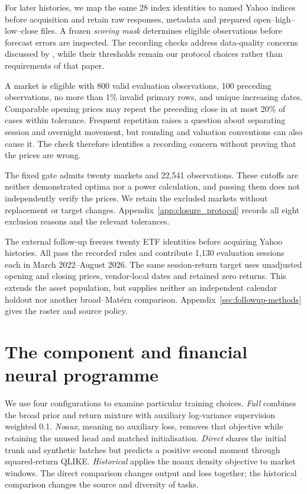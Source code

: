 For later histories, we map the same 28 index identities to named Yahoo indices before acquisition and retain raw responses, metadata and prepared open--high--low--close files. A frozen \emph{scoring mask} determines eligible observations before forecast errors are inspected. The recording checks address data-quality concerns discussed by \citet{ince2006data}, while their thresholds remain our protocol choices rather than requirements of that paper.

A market is eligible with 800 valid evaluation observations, 100 preceding observations, no more than 1\% invalid primary rows, and unique increasing dates. Comparable opening prices may repeat the preceding close in at most 20\% of cases within tolerance. Frequent repetition raises a question about separating session and overnight movement, but rounding and valuation conventions can also cause it. The check therefore identifies a recording concern without proving that the prices are wrong.

The fixed gate admits twenty markets and 22,541 observations. These cutoffs are neither demonstrated optima nor a power calculation, and passing them does not independently verify the prices. We retain the excluded markets without replacement or target changes. Appendix~\ref{app:closure_protocol} records all eight exclusion reasons and the relevant tolerances.

The external follow-up freezes twenty ETF identities before acquiring Yahoo histories. All pass the recorded rules and contribute 1,130 evaluation sessions each in March 2022--August 2026. The same session-return target uses unadjusted opening and closing prices, vendor-local dates and retained zero returns. This extends the asset population, but supplies neither an independent calendar holdout nor another broad--Mat\'ern comparison. Appendix~\ref{sec:followup-methods} gives the roster and source policy.

\section{The component and financial neural programme}
\label{sec:new-programme-design}

We use four configurations to examine particular training choices. \emph{Full} combines the broad prior and return mixture with auxiliary log-variance supervision weighted 0.1. \emph{Noaux}, meaning no auxiliary loss, removes that objective while retaining the unused head and matched initialisation. \emph{Direct} shares the initial trunk and synthetic batches but predicts a positive second moment through squared-return QLIKE. \emph{Historical} applies the noaux density objective to market windows. The direct comparison changes output and loss together; the historical comparison changes the source and diversity of tasks.


